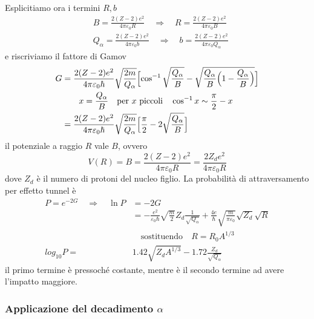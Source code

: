 Esplicitiamo ora i termini $R, b$
\begin{equation}
\begin{split}
& B = \frac{2 (Z-2) e^2}{4 \pi \varepsilon_0 R} \quad\Rightarrow\quad R = \frac{2 (Z-2) e^2}{4 \pi \varepsilon_0 B} \\
& Q_{\alpha} = \frac{2 (Z-2) e^2}{4 \pi \varepsilon_0 b} \quad\Rightarrow\quad b = \frac{2 (Z-2) e^2}{4 \pi \varepsilon_0 Q_{\alpha}} 
\end{split}
\end{equation}
e riscriviamo il fattore di Gamov
\begin{equation}
\begin{split}
G &= \frac{2 (Z-2) e^2}{4 \pi \varepsilon_0 \hbar} \sqrt{\frac{2m}{Q_{\alpha}}} \Bigl[  \cos^{-1}\sqrt{\frac{Q_{\alpha}}{B}} - \sqrt{\frac{Q_{\alpha}}{B} \Bigl(  1 - \frac{Q_{\alpha}}{B}  \Bigr)}  \Bigr] \\
& \quad\quad x=\frac{Q_{\alpha}}{B} \quad\mbox{per $x$ piccoli}\quad \cos^{-1}x \sim \frac{\pi}{2} - x \\
& = \frac{2 (Z-2) e^2}{4 \pi \varepsilon_0 \hbar} \sqrt{\frac{2m}{Q_{\alpha}}} \Bigl[  \frac{\pi}{2} - 2 \sqrt{\frac{Q_{\alpha}}{B}}  \Bigr]
\end{split}
\end{equation}
il potenziale a raggio $R$ vale $B$, ovvero
\begin{equation}
V(R) = B = \frac{2 (Z-2) e^2}{4 \pi \varepsilon_0 R} = \frac{2 Z_d e^2}{4 \pi \varepsilon_0 R}
\end{equation}
dove $Z_d$ è il numero di protoni del nucleo figlio.
La probabilità di attraversamento per effetto tunnel è
\begin{equation}
\begin{split}
P = e^{-2 G} \quad\Rightarrow\quad \ln P &= -2 G \\
& = -\frac{e^2}{\varepsilon_0 \hbar} \sqrt{\frac{m}{2}} Z_d \frac{1}{\sqrt{Q_{\alpha}}} + \frac{4 e}{\hbar} \sqrt{\frac{m}{\pi \varepsilon_0}} \sqrt{Z_d} \sqrt{R} \\ 
& \quad\mbox{sostituendo}\quad R = R_0 A^{1/3} \\
log_{10} P = & 1.42 \sqrt{Z_d A^{1/3}} - 1.72 \frac{Z_d}{\sqrt{Q_{\alpha}}}
\end{split}
\end{equation}
il primo termine è pressoché costante, mentre è il secondo termine ad avere l'impatto maggiore.

\subsubsection{Applicazione del decadimento $\alpha$}

